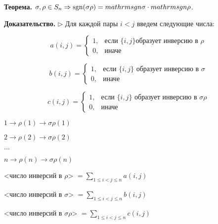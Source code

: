 \vspace{\baselineskip}
\textbf{Теорема.} $\sigma, \rho \in S_n \Rightarrow \mathrm{sgn}(\sigma \rho) = \\mathrm{sgn} \sigma \cdot \\mathrm{sgn} \rho$.

\vspace{\baselineskip}
\textbf{Доказательство.} $\rhd$ Для каждой пары $i < j$ введем следующие числа:


\begin{equation*}
	a(i,j) = \begin{cases}
		1, &\text{если }  \{i, j \} \text{образует инверсию в } \rho \\
		0, &\text{иначе}
	\end{cases}
\end{equation*}

\begin{equation*}
	b(i,j) = \begin{cases}
		1, &\text{если }  \{i, j \} \text{ образует инверсию в } \sigma \\
		0, &\text{иначе}
	\end{cases}
\end{equation*}

\begin{equation*}
	c(i,j) = \begin{cases}
		1, &\text{если }  \{i, j \} \text{ образует инверсию в } \sigma \rho \\
		0, &\text{иначе}
	\end{cases}
\end{equation*}

\vspace{\baselineskip}
$1 \rightarrow \rho (1) \rightarrow \sigma \rho (1)$

$2 \rightarrow \rho (2) \rightarrow \sigma \rho (2)$

$\dots$

$n \rightarrow \rho (n) \rightarrow \sigma \rho (n)$

\vspace{\baselineskip}
<число инверсий в $\rho$> $= \sum\limits_{1 \leq i < j \leq n} a(i, j) $

\vspace{\baselineskip}

<число инверсий в $\sigma$> $= \sum\limits_{1 \leq i < j \leq n} b(i, j) $

\vspace{\baselineskip}

<число инверсий в $\sigma \rho$> $= \sum\limits_{1 \leq i < j \leq n} c(i, j) $

